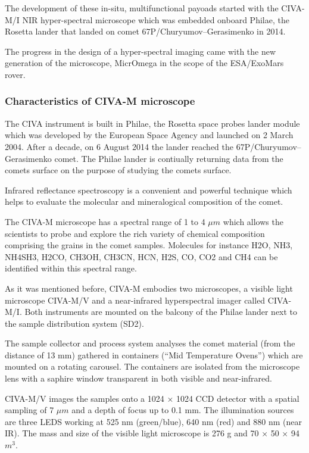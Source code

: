 The development of these in-situ, multifunctional payoads 
started with the CIVA-M/I NIR hyper-spectral microscope which was embedded onboard Philae, the Rosetta lander that landed on comet 67P/Churyumov–Gerasimenko in 2014.

The progress in the design of a hyper-spectral imaging came with the new generation of the microscope, MicrOmega in the scope of the ESA/ExoMars rover.
\cite{Pilorget201342}

\subsubsection{Characteristics of CIVA-M microscope \cite{Bibring2007}}


The CIVA instrument is built in Philae, the Rosetta space probes lander module which was developed by the European Space Agency and launched on 2 March 2004. After a decade, on 6 August 2014 the lander reached the 67P/Churyumov–Gerasimenko comet. The Philae lander is contiually returning data from the comets surface on the purpose of studying the comets surface.
\cite{wiki:Rosetta}


Infrared reflectance spectroscopy is a convenient and powerful technique which helps to evaluate the molecular and mineralogical composition of the comet.

The CIVA-M microscope has a spectral range of 1 to 4 $\mu m$ which allows the scientists to probe and explore the rich variety of chemical composition comprising the grains in the comet samples.
Molecules for instance H2O, NH3, NH4SH3, H2CO, CH3OH, CH3CN, HCN, H2S, CO, CO2 and CH4 can be identified within this spectral range.

As it was mentioned before, CIVA-M embodies two microscopes, a visible light microscope CIVA-M/V and a near-infrared hyperspectral imager called CIVA-M/I. Both instruments are mounted on the balcony of  the Philae lander next to the sample distribution system (SD2).

The sample collector and process system analyses the comet material (from the distance of 13 mm) gathered in containers (“Mid Temperature
Ovens”) which are mounted on a rotating carousel. The containers are isolated from the microscope lens with a saphire window transparent in both visible and near-infrared.

CIVA-M/V images the samples onto a 1024 × 1024 CCD detector with a spatial sampling of 7 $\mu m$ and a depth of focus up to 0.1 mm. The illumination sources are three LEDS working at 525 nm (green/blue), 640 nm (red) and 880 nm (near IR). The mass and size of the visible light microscope is 276 g and 70 × 50 × 94 $m^3$. 

